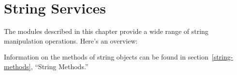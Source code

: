 \chapter{String Services}
\label{strings}

The modules described in this chapter provide a wide range of string
manipulation operations.  Here's an overview:

\localmoduletable

Information on the methods of string objects can be found in
section~\ref{string-methods}, ``String Methods.''
